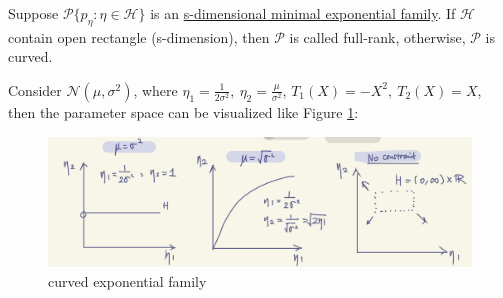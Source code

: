 \begin{definition}
    Suppose $\mathcal{P}\{p_\eta:\eta\in\mathcal{H}\}$ is an \uline{s-dimensional minimal exponential family}.
    If $\mathcal{H}$ contain open rectangle (s-dimension), then $\mathcal{P}$ is called full-rank, 
    otherwise, $\mathcal{P}$ is curved.
\end{definition}

\begin{example}
    Consider $\mathcal{N}(\mu,\sigma^2)$, where $\eta_1=\frac{1}{2\sigma^2},~\eta_2=\frac{\mu}{\sigma^2}$,
    $T_1(X)=-X^2,~T_2(X)=X$, 
    then the parameter space can be visualized like Figure \ref{fig:fullrank_curved}:
\end{example}
\begin{figure}[hptb]
    \centering
    \includegraphics[width=\textwidth]{figures/fullrank-curved.png}
    \caption{curved exponential family}
    \label{fig:fullrank_curved}
\end{figure}

